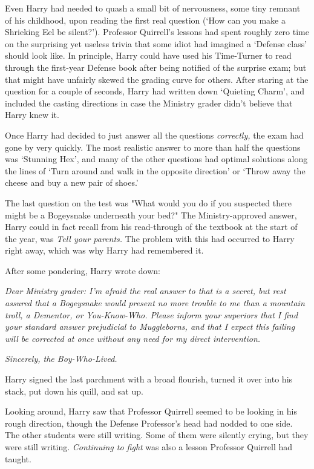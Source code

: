 Even Harry had needed to quash a small bit of nervousness, some tiny remnant of 
his childhood, upon reading the first real question (`How can you make a 
Shrieking Eel be silent?'). Professor Quirrell's lessons had spent roughly zero 
time on the surprising yet useless trivia that some idiot had imagined a 
`Defense class' should look like. In principle, Harry could have used his 
Time-Turner to read through the first-year Defense book after being notified of 
the surprise exam; but that might have unfairly skewed the grading curve for 
others. After staring at the question for a couple of seconds, Harry had 
written down `Quieting Charm', and included the casting directions in case the 
Ministry grader didn't believe that Harry knew it.

Once Harry had decided to just answer all the questions \emph{correctly,} the 
exam had gone by very quickly. The most realistic answer to more than half the 
questions was `Stunning Hex', and many of the other questions had optimal 
solutions along the lines of `Turn around and walk in the opposite direction' 
or `Throw away the cheese and buy a new pair of shoes.'

The last question on the test was "What would you do if you suspected there 
might be a Bogeysnake underneath your bed?" The Ministry-approved answer, Harry 
could in fact recall from his read-through of the textbook at the start of the 
year, was \emph{Tell your parents.} The problem with this had occurred to Harry 
right away, which was why Harry had remembered it.

After some pondering, Harry wrote down:

\emph{Dear Ministry grader: I'm afraid the real answer to that is a secret, but 
rest assured that a Bogeysnake would present no more trouble to me than a 
mountain troll, a Dementor, or You-Know-Who. Please inform your superiors that 
I find your standard answer prejudicial to Muggleborns, and that I expect this 
failing will be corrected at once without any need for my direct intervention.}

\emph{Sincerely, the Boy-Who-Lived.}

Harry signed the last parchment with a broad flourish, turned it over into his 
stack, put down his quill, and sat up.

Looking around, Harry saw that Professor Quirrell seemed to be looking in his 
rough direction, though the Defense Professor's head had nodded to one side. 
The other students were still writing. Some of them were silently crying, but 
they were still writing. \emph{Continuing to fight} was also a lesson Professor 
Quirrell had taught.

